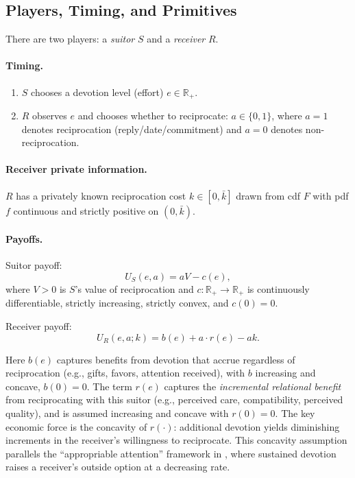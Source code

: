 \documentclass[AER]{AEA}
\begin{document}
\subsection{Players, Timing, and Primitives}

There are two players: a \textit{suitor} $S$ and a \textit{receiver} $R$.

\paragraph{Timing.}
\begin{enumerate}
  \item $S$ chooses a devotion level (effort) $e \in \mathbb{R}_+$.
  \item $R$ observes $e$ and chooses whether to reciprocate: $a \in \{0, 1\}$, where
    $a = 1$ denotes reciprocation (reply/date/commitment) and $a = 0$ denotes
    non-reciprocation.
\end{enumerate}

\paragraph{Receiver private information.} $R$ has a privately known reciprocation cost
$k \in [0, \bar{k}]$ drawn from cdf $F$ with pdf $f$ continuous and strictly positive on
$(0, \bar{k})$.

\paragraph{Payoffs.} Suitor payoff:
\begin{equation}
  U_S(e, a) = aV - c(e),
\end{equation}
where $V > 0$ is $S$'s value of reciprocation and $c : \mathbb{R}_+ \to \mathbb{R}_+$ is
continuously differentiable, strictly increasing, strictly convex, and $c(0) = 0$.

Receiver payoff:
\begin{equation}
  U_R(e, a; k) = b(e) + a \cdot r(e) - ak.
\end{equation}

Here $b(e)$ captures benefits from devotion that accrue regardless of reciprocation
(e.g., gifts, favors, attention received), with $b$ increasing and concave, $b(0) = 0$.
The term $r(e)$ captures the \textit{incremental relational benefit} from reciprocating
with this suitor (e.g., perceived care, compatibility, perceived quality), and is assumed
increasing and concave with $r(0) = 0$. The key economic force is the concavity of
$r(\cdot)$: additional devotion yields diminishing increments in the receiver's
willingness to reciprocate. This concavity assumption parallels the ``appropriable
attention'' framework in \citet{Price2026}, where sustained devotion raises a receiver's
outside option at a decreasing rate.
\end{document}
